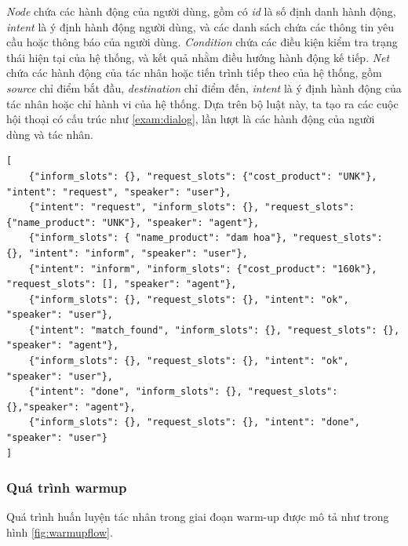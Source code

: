 \textit{Node} chứa các hành động của người dùng, gồm có \textit{id} là số định danh hành động, \textit{intent} là ý định hành động người dùng, và các danh sách chứa các thông tin yêu cầu hoặc thông báo của người dùng. \textit{Condition} chứa các điều kiện kiểm tra trạng thái hiện tại của hệ thống, và kết quả nhằm điều hướng hành động kế tiếp. \textit{Net} chứa các hành động của tác nhân hoặc tiến trình tiếp theo của hệ thống, gồm \textit{source} chỉ điểm bắt đầu, \textit{destination} chỉ điểm đến, \textit{intent} là ý định hành động của tác nhân hoặc chỉ hành vi của hệ thống. Dựa trên bộ luật này, ta tạo ra các cuộc hội thoại có cấu trúc như \ref{exam:dialog}, lần lượt là các hành động của người dùng và tác nhân.

\renewcommand{\lstlistingname}{Ví dụ}
\begin{lstlisting}[caption={Cuộc hội thoại được tạo bởi bộ luật},label={exam:dialog},language=code_en,firstnumber=1]
[
    {"inform_slots": {}, "request_slots": {"cost_product": "UNK"}, "intent": "request", "speaker": "user"},
    {"intent": "request", "inform_slots": {}, "request_slots": {"name_product": "UNK"}, "speaker": "agent"},
    {"inform_slots": { "name_product": "dam hoa"}, "request_slots": {}, "intent": "inform", "speaker": "user"},
    {"intent": "inform", "inform_slots": {"cost_product": "160k"}, "request_slots": [], "speaker": "agent"},
    {"inform_slots": {}, "request_slots": {}, "intent": "ok", "speaker": "user"},
    {"intent": "match_found", "inform_slots": {}, "request_slots": {}, "speaker": "agent"},
    {"inform_slots": {}, "request_slots": {}, "intent": "ok", "speaker": "user"},
    {"intent": "done", "inform_slots": {}, "request_slots": {},"speaker": "agent"},
    {"inform_slots": {}, "request_slots": {}, "intent": "done", "speaker": "user"}
]
\end{lstlisting}

\subsubsection{Quá trình warmup}
Quá trình huấn luyện tác nhân trong giai đoạn warm-up được mô tả như trong hình \ref{fig:warmupflow}.

